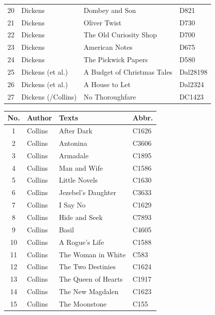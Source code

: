 \documentclass[a4paper,10pt,twoside,fleqn]{article}
\begin{document}
\begin{table}
\begin{minipage}{.62\linewidth}
\begin{tabular}{c l l l}
20		& Dickens		& Dombey and Son			& D821     \\
21		& Dickens		& Oliver Twist				& D730        \\
22		& Dickens		&The Old Curiosity Shop			& D700         \\
23		& Dickens		& American Notes			& D675         \\
24		& Dickens		&The Pickwick Papers			& D580           \\
25		& Dickens     (et al.)  & A Budget of Christmas Tales		& Dal28198         \\
26		& Dickens (et al.)	& A House to Let			& Dal2324     \\
27		& Dickens (/Collins)     & No Thoroughfare			& DC1423       \\ \bottomrule
\end{tabular}
\end{minipage}%
\hfill
    \begin{minipage}{.62\linewidth}
      \centering
\label{table:Collins-data}
\begin{tabular}{c l l l } \\\hline \hline
\textbf{No.}	& \textbf{Author} 		& \textbf{Texts} 		& \textbf{Abbr.} \\ \hline
1		& Collins       		& After Dark			& C1626    \\
2		& Collins			& Antonina			& C3606        \\
3		& Collins			& Armadale			& C1895  \\
4		& Collins			& Man and Wife			& C1586      \\
5		& Collins			& Little Novels			& C1630    \\
6		& Collins			& Jezebel's Daughter		& C3633    \\
7		& Collins			& I Say No			& C1629       \\
8		& Collins			& Hide and Seek			& C7893  \\
9		& Collins			& Basil				& C4605 \\
10		& Collins			& A Rogue's Life		& C1588     \\
11		& Collins			& The Woman in White		& C583         \\
12		& Collins			& The Two Destinies		& C1624    \\
13		& Collins			& The Queen of Hearts		& C1917        \\
14		& Collins			& The New Magdalen		& C1623     \\
15		& Collins			& The Moonstone			& C155         \\

\end{tabular}
\end{minipage}
\end{table}
\end{document}
